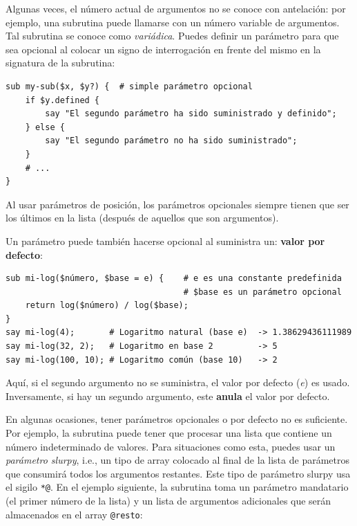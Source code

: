 Algunas veces, el número actual de argumentos no se conoce
con antelación: por ejemplo, una subrutina puede llamarse con 
un número variable de argumentos. Tal subrutina se conoce como
\emph{variádica}. Puedes definir un parámetro para que sea opcional
al colocar un signo de interrogación en frente del mismo en la
signatura de la subrutina:

\begin{verbatim}
sub my-sub($x, $y?) {  # simple parámetro opcional
    if $y.defined {
        say "El segundo parámetro ha sido suministrado y definido";
    } else {
        say "El segundo parámetro no ha sido suministrado";
    }
    # ...
}
\end{verbatim}

Al usar parámetros de posición, los parámetros opcionales siempre
tienen que ser los últimos en la lista (después de aquellos que 
son argumentos).

Un parámetro puede también hacerse opcional al suministra un:
{\bf valor por defecto}:

\begin{verbatim}
sub mi-log($número, $base = e) {    # e es una constante predefinida
                                    # $base es un parámetro opcional
    return log($número) / log($base);
}
say mi-log(4);       # Logaritmo natural (base e)  -> 1.38629436111989
say mi-log(32, 2);   # Logaritmo en base 2         -> 5
say mi-log(100, 10); # Logaritmo común (base 10)   -> 2
\end{verbatim}

Aquí, si el segundo argumento no se suministra, el valor por defecto 
(\emph{e}) es usado. Inversamente, si hay un segundo argumento, este
{\bf anula} el valor por defecto.

\label{slurpy_parameters}
En algunas ocasiones, tener parámetros opcionales o por defecto no
es suficiente. Por ejemplo, la subrutina puede tener que procesar una 
lista que contiene un número indeterminado de valores. Para situaciones
como esta, puedes usar un \emph{parámetro slurpy}, i.e., un tipo de
array colocado al final de la lista de parámetros que consumirá todos los 
argumentos restantes. Este tipo de parámetro slurpy usa el sigilo \verb|*@|.
En el ejemplo siguiente, la subrutina toma un parámetro mandatario
(el primer número de la lista) y un lista de argumentos adicionales
que serán almacenados en el array \verb|@resto|:

